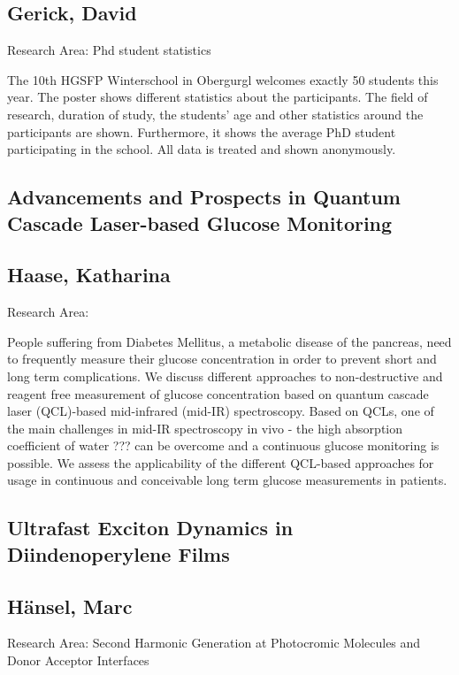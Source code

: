 \subsection*{\centering\normalsize Gerick, David}
Research Area: Phd student statistics \newline

\noindent The 10th HGSFP Winterschool in Obergurgl welcomes exactly 50 students this year. The poster shows different statistics about the participants. The field of research, duration of study, the students' age and other statistics around the participants are shown. Furthermore, it shows the average PhD student participating in the school. All data is treated and shown anonymously.
\newpage

\subsection*{\centering \large Advancements and Prospects in Quantum Cascade Laser-based Glucose Monitoring}
\subsection*{\centering \normalsize Haase, Katharina}
Research Area: \newline

\noindent People suffering from Diabetes Mellitus, a metabolic disease of the pancreas, need to frequently measure their glucose concentration in order to prevent short and long term complications. We discuss different approaches to non-destructive and reagent free measurement of glucose concentration based on quantum cascade laser (QCL)-based mid-infrared (mid-IR) spectroscopy. Based on QCLs, one of the main challenges in mid-IR spectroscopy in vivo - the high absorption coefficient of water ??? can be overcome and a continuous glucose monitoring is possible. We assess the applicability of the different QCL-based approaches for usage in continuous and conceivable long term glucose measurements in patients.

\subsection*{\centering \large Ultrafast Exciton Dynamics in Diindenoperylene Films}
\subsection*{\centering \normalsize H\"ansel, Marc}
Research Area: Second Harmonic Generation at Photocromic Molecules and Donor Acceptor Interfaces\newline

